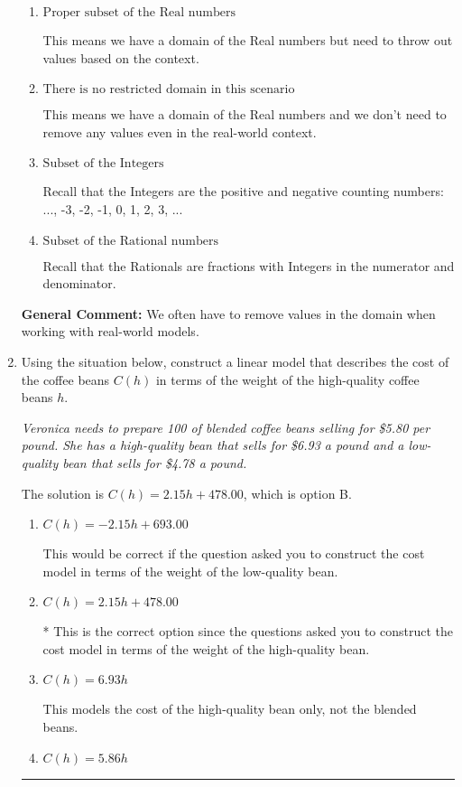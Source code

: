 \documentclass{extbook}[14pt]
\newcommand{\litem}[1]{\item #1

\rule{\textwidth}{0.4pt}}
\begin{document}
\begin{enumerate}
{\begin{enumerate}[label=\Alph*.]
Recall that the Naturals are the counting numbers: 1, 2, 3, ...
\item \( \text{Proper subset of the Real numbers} \)

This means we have a domain of the Real numbers but need to throw out values based on the context.
\item \( \text{There is no restricted domain in this scenario} \)

This means we have a domain of the Real numbers and we don't need to remove any values even in the real-world context.
\item \( \text{Subset of the Integers} \)

Recall that the Integers are the positive and negative counting numbers: ..., -3, -2, -1, 0, 1, 2, 3, ... 
\item \( \text{Subset of the Rational numbers} \)

Recall that the Rationals are fractions with Integers in the numerator and denominator.
\end{enumerate}

\textbf{General Comment:} We often have to remove values in the domain when working with real-world models.
}
\litem{
Using the situation below, construct a linear model that describes the cost of the coffee beans $C(h)$ in terms of the weight of the high-quality coffee beans $h$.

\begin{center}
    \textit{ Veronica needs to prepare 100 of blended coffee beans selling for \$5.80 per pound. She has a high-quality bean that sells for \$6.93 a pound and a low-quality bean that sells for \$4.78 a pound. }
\end{center}
The solution is \( C(h) = 2.15 h + 478.00 \), which is option B.\begin{enumerate}[label=\Alph*.]
\item \( C(h) = -2.15 h + 693.00 \)

This would be correct if the question asked you to construct the cost model in terms of the weight of the low-quality bean.
\item \( C(h) = 2.15 h + 478.00 \)

* This is the correct option since the questions asked you to construct the cost model in terms of the weight of the high-quality bean.
\item \( C(h) = 6.93 h \)

This models the cost of the high-quality bean only, not the blended beans.
\item \( C(h) = 5.86 h \)


\end{enumerate}}
\end{enumerate}
\end{document}
